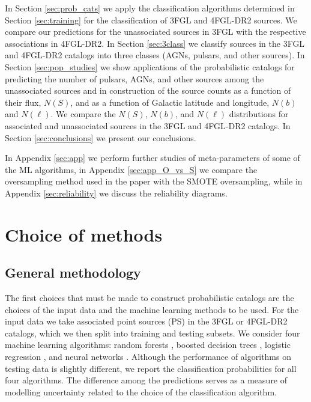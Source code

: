 \documentclass{aa}
\newcommand{\lb}{\label}
\begin{document}
In Section \ref{sec:prob_cats} we apply the classification algorithms determined in Section \ref{sec:training} for the classification of 3FGL and 4FGL-DR2 sources.
We compare our predictions for the unassociated sources in 3FGL with the respective associations in 4FGL-DR2.
In Section \ref{sec:3class} we classify sources in the 3FGL and 4FGL-DR2 catalogs into three classes (AGNs, pulsars, and other sources).
In Section \ref{sec:pop_studies} we show applications of the probabilistic catalogs for predicting the number of pulsars, AGNs, and other sources among the unassociated sources and in construction of the source counts as a function of their flux, $N(S)$, and as a function of 
Galactic latitude and longitude, $N(b)$ and $N(\ell)$.
We compare the $N(S)$, $N(b)$, and $N(\ell)$ distributions for associated and unassociated sources in the 3FGL and 4FGL-DR2 catalogs.
In Section \ref{sec:conclusions} we present our conclusions.

In Appendix \ref{sec:app} we perform further studies of meta-parameters of some of the ML algorithms, 
in Appendix \ref{sec:app_O_vs_S} we compare the oversampling method used in the paper with the SMOTE oversampling,
while in Appendix \ref{sec:reliability} we discuss the reliability diagrams.


\section{Choice of methods}
\lb{sec:methods}


\subsection{General methodology}


The first choices that must be made to construct probabilistic catalogs are the choices of the input data and the machine learning methods to be used.
For the input data we take associated point sources (PS) in the 3FGL or 4FGL-DR2 catalogs, which we then split into training and testing subsets.
We consider four machine learning algorithms: random forests \citep[RF,][]{709601, Breiman:2001hzm}, 
boosted decision trees \citep[BDT,][]{friedman2001},  
logistic regression \citep[LR,][]{cox1958}, 
and neural networks \citep[NN,][]{Hopfield:1982pe}.
Although the performance of algorithms on testing data is slightly different, 
we report the classification probabilities for all four algorithms.
The difference among the predictions serves as a measure of modelling uncertainty related 
to the choice of the classification algorithm.
\end{document}
